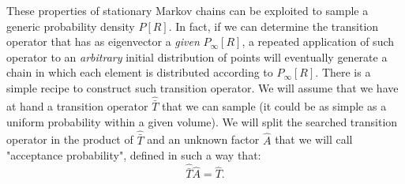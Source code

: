 These properties of stationary Markov chains can be exploited to sample a generic probability density $P[R]$. In fact, if we can determine the transition operator that has as eigenvector a {\em given} $P_\infty[R]$, a repeated application of such operator to an {\em arbitrary} initial distribution of points will eventually generate a chain in which each element is distributed according to $P_\infty[R]$. There is a simple recipe to construct such transition operator. We will assume that we have at hand a transition operator $\hat{\bar{T}}$ that we can sample (it could be as simple as a uniform probability within a given volume). We will split the searched transition operator
in the product of $\hat{\bar{T}}$ and an unknown factor $\hat{A}$ that we will call "acceptance probability", defined in such a way that:
\begin{equation}
\hat{\bar{T}}\hat{A}=\hat{T}.
\end{equation}


